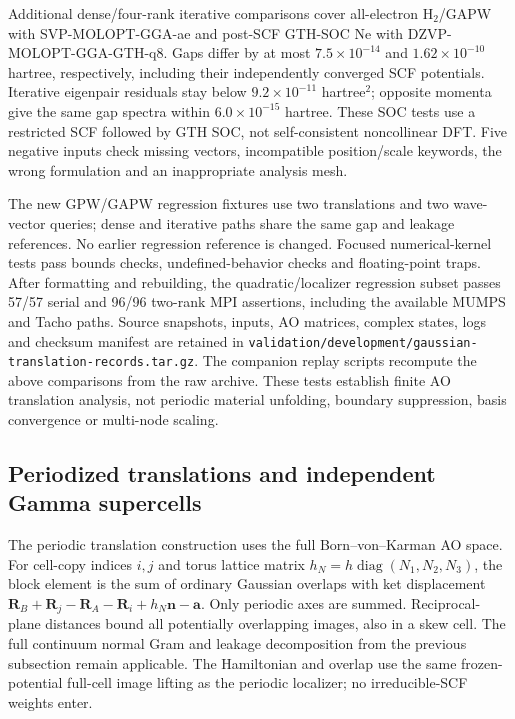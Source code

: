 \documentclass[11pt]{article}
\begin{document}
Additional dense/four-rank iterative comparisons cover
all-electron H$_2$/GAPW with SVP-MOLOPT-GGA-ae and post-SCF
GTH-SOC Ne with DZVP-MOLOPT-GGA-GTH-q8. Gaps differ by at most
$7.5\times10^{-14}$ and $1.62\times10^{-10}$ hartree,
respectively, including their independently converged SCF
potentials. Iterative eigenpair residuals stay below
$9.2\times10^{-11}$ hartree$^2$; opposite momenta give the same
gap spectra within $6.0\times10^{-15}$ hartree. These SOC tests
use a restricted SCF followed by GTH SOC, not self-consistent
noncollinear DFT. Five negative inputs check missing vectors,
incompatible position/scale keywords, the wrong formulation and
an inappropriate analysis mesh.

The new GPW/GAPW regression fixtures use two translations and two
wave-vector queries; dense and iterative paths share the same
gap and leakage references. No earlier regression reference is
changed. Focused numerical-kernel tests pass bounds checks,
undefined-behavior checks and floating-point traps. After formatting
and rebuilding, the quadratic/localizer regression subset passes
57/57 serial and 96/96 two-rank MPI assertions, including the
available MUMPS and Tacho paths. Source snapshots,
inputs, AO matrices, complex states, logs and checksum manifest are
retained in
\nolinkurl{validation/development/gaussian-translation-records.tar.gz}.
The companion replay scripts recompute the above comparisons from
the raw archive. These tests establish finite AO translation
analysis, not periodic material unfolding, boundary suppression,
basis convergence or multi-node scaling.

\subsection{Periodized translations and independent Gamma supercells}
\label{sec:si-torus-translation}
The periodic translation construction uses the full
Born--von--Karman AO space. For cell-copy indices $i,j$ and
torus lattice matrix $h_N=h\operatorname{diag}(N_1,N_2,N_3)$,
the block element is the sum of ordinary Gaussian overlaps with
ket displacement
$\bm R_B+\bm R_j-\bm R_A-\bm R_i+h_N\bm n-\bm a$.
Only periodic axes are summed. Reciprocal-plane distances bound
all potentially overlapping images, also in a skew cell.
The full continuum normal Gram and leakage decomposition from
the previous subsection remain applicable. The Hamiltonian and
overlap use the same frozen-potential full-cell image lifting as
the periodic localizer; no irreducible-SCF weights enter.
\end{document}
